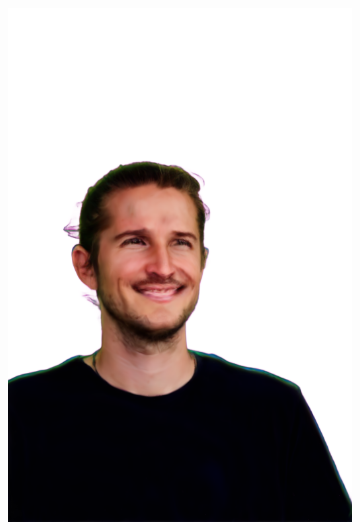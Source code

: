 \begin{figure}[ht]
\begin{subfigure}{0.08\linewidth}
        \includegraphics[width=\textwidth]{Figures/results/low/ephra_smile/11_render.png}

\end{subfigure}
\end{figure}
